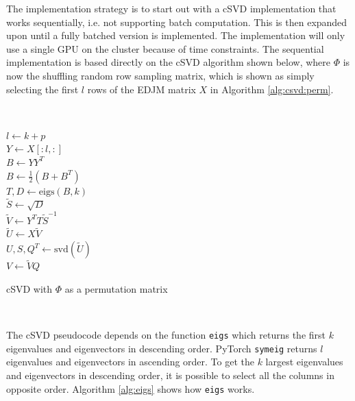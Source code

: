   
The implementation strategy is to start out with a cSVD implementation that works sequentially, i.e. not supporting batch computation. This is then expanded upon until a fully batched version is implemented. The implementation will only use a single GPU on the cluster because of time constraints. The sequential implementation is based directly on the cSVD algorithm shown below, where $\Phi$ is now the shuffling random row sampling matrix, which is shown as simply selecting the first $l$ rows of the EDJM matrix $X$ in Algorithm \ref{alg:csvd:perm}.

$ $ \newline

\begin{algorithm}[H]
\SetAlgoLined
{}
$l \gets k + p$ \\
$Y \gets X[:l,:]$ \\
$B \gets Y Y^T$ \\
$B \gets \frac{1}{2}(B + B^T)$ \\
$T,D \gets \mathrm{eigs}(B,k)$ \\
$\tilde S \gets \sqrt{D}$ \\
$\tilde V \gets Y^T T \tilde S^{-1}$ \\
$\tilde U \gets X \tilde V$ \\
$U,S,Q^T \gets \mathrm{svd}(\tilde U)$ \\
$V \gets \tilde V Q$ \\
\caption{cSVD with $\Phi$ as a permutation matrix}
\label{alg:csvd:perm}
\end{algorithm}

$ $ \newline

The cSVD pseudocode depends on the function \texttt{eigs} which returns the first $k$ eigenvalues and eigenvectors in descending order. PyTorch \texttt{symeig} returns $l$ eigenvalues and eigenvectors in ascending order. To get the $k$ largest eigenvalues and eigenvectors in descending order, it is possible to select all the columns in opposite order. Algorithm \ref{alg:eigs} shows how \texttt{eigs} works.

$ $ \newline

